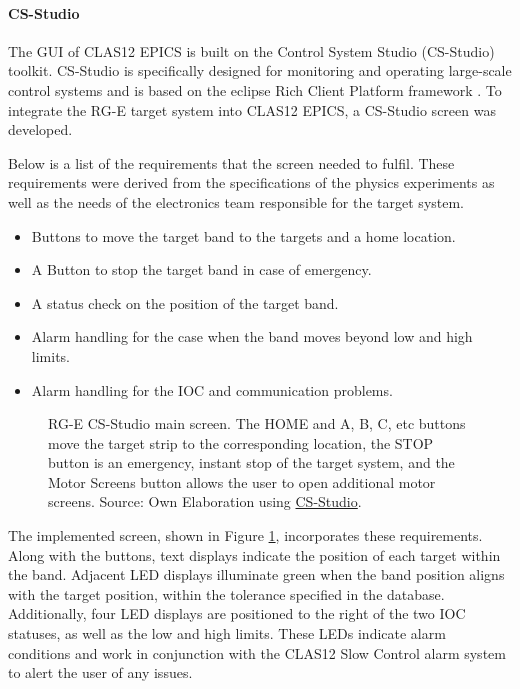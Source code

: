 \paragraph{CS-Studio}
    The GUI of CLAS12 EPICS is built on the Control System Studio (CS-Studio) toolkit.
    CS-Studio is specifically designed for monitoring and operating large-scale control systems and is based on the eclipse Rich Client Platform framework \cite{kasemir2007}.
    To integrate the RG-E target system into CLAS12 EPICS, a CS-Studio screen was developed.

    Below is a list of the requirements that the screen needed to fulfil.
    These requirements were derived from the specifications of the physics experiments as well as the needs of the electronics team responsible for the target system.

    \begin{itemize}
        \item
            Buttons to move the target band to the targets and a home location.
        \item
            A Button to stop the target band in case of emergency.
        \item
            A status check on the position of the target band.
        \item
            Alarm handling for the case when the band moves beyond low and high limits.
        \item
            Alarm handling for the IOC and communication problems.
    \end{itemize}

    \begin{figure}[b!]
        \centering{}
        \caption[RG-E CS-Studio main screen]{RG-E CS-Studio main screen. The HOME and A, B, C, etc buttons move the target strip to the corresponding location, the STOP button is an emergency, instant stop of the target system, and the Motor Screens button allows the user to open additional motor screens.
        Source: Own Elaboration using \hyperlink{controlsystemstudio.org/}{CS-Studio}.}
        \label{fig::11.312::rge_motorx}
    \end{figure}

The implemented screen, shown in Figure \ref{fig::11.312::rge_motorx}, incorporates these requirements.
    Along with the buttons, text displays indicate the position of each target within the band.
    Adjacent LED displays illuminate green when the band position aligns with the target position, within the tolerance specified in the database.
    Additionally, four LED displays are positioned to the right of the two IOC statuses, as well as the low and high limits.
    These LEDs indicate alarm conditions and work in conjunction with the CLAS12 Slow Control alarm system to alert the user of any issues.


